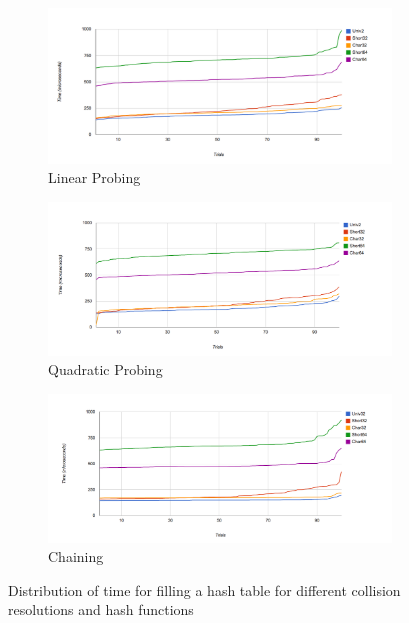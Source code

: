 \documentclass[11pt]{article}
\begin{document}
\begin{figure}
	\centering
        \begin{subfigure}[b]{0.9\textwidth}
                \centering
                \includegraphics[width=\textwidth]{linear-time.png}
                \caption{Linear Probing}
                \label{fig:lineartime}
        \end{subfigure}
        
        \begin{subfigure}[b]{0.9\textwidth}
                \centering
                \includegraphics[width=\textwidth]{quad-time.png}
                \caption{Quadratic Probing}
                \label{fig:chaining-collision}
        \end{subfigure}
        
         \begin{subfigure}[b]{0.9\textwidth}
                \centering
                \includegraphics[width=\textwidth]{chaining-time.png}
                \caption{Chaining}
                \label{fig:chaining-max}
        \end{subfigure}
        \caption{Distribution of time for filling a hash table for different collision resolutions and hash functions}\label{fig:timeline}
\end{figure}
\end{document}
